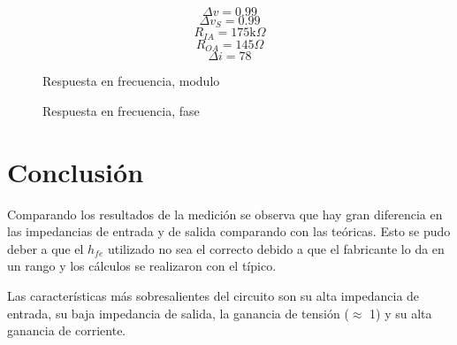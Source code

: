 \documentclass[../../main.tex]{subfiles}
\begin{document}
$$\Delta v = 0.99$$
$$ \Delta v_S =0.99 $$
$$ R_{IA} = 175\mathrm{k}\Omega $$
$$R_{OA}=145\Omega $$
$$\Delta i= 78 $$

\begin{figure}[H]	
	\centering
	\caption{Respuesta en frecuencia, modulo}
\end{figure}

\begin{figure}[H]	
	\centering
	\caption{Respuesta en frecuencia, fase}
\end{figure}


\section{Conclusión}
Comparando los resultados de la medición se observa que hay gran diferencia en las impedancias de entrada y de salida comparando con las te\'oricas. Esto se pudo deber a que el $h_{fe}$ utilizado no sea el correcto debido a que el fabricante lo da en un rango y los cálculos se realizaron con el t\'ipico. 
\par Las características más sobresalientes del circuito son su alta impedancia de entrada, su baja impedancia de salida, la ganancia de tensión ($\approx$ 1) y su alta ganancia de corriente.
\end{document}
